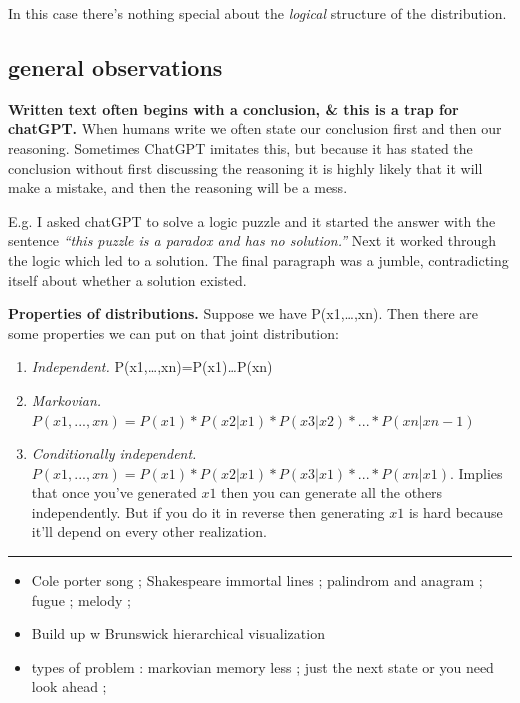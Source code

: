 \documentclass[
  11pt,
  letterpaper,
  DIV=11,
  numbers=noendperiod,
  oneside]{scrartcl}
\begin{document}
In this case there's nothing special about the \emph{logical} structure
of the distribution.

\hypertarget{general-observations}{%
\subsection{general observations}\label{general-observations}}

\textbf{Written text often begins with a conclusion, \& this is a trap
for chatGPT.} When humans write we often state our conclusion first and
then our reasoning. Sometimes ChatGPT imitates this, but because it has
stated the conclusion without first discussing the reasoning it is
highly likely that it will make a mistake, and then the reasoning will
be a mess.

E.g. I asked chatGPT to solve a logic puzzle and it started the answer
with the sentence \emph{``this puzzle is a paradox and has no
solution.''} Next it worked through the logic which led to a solution.
The final paragraph was a jumble, contradicting itself about whether a
solution existed.

\textbf{Properties of distributions.} Suppose we have P(x1,\ldots,xn).
Then there are some properties we can put on that joint distribution:

\begin{enumerate}
\def\labelenumi{\arabic{enumi}.}
\item
  \emph{Independent.} P(x1,\ldots,xn)=P(x1)\emph{\ldots{}}P(xn)
\item
  \emph{Markovian.}
  \(P(x1,...,xn)=P(x1)*P(x2|x1)*P(x3|x2)*...*P(xn|xn-1)\)
\item
  \emph{Conditionally independent.}
  \(P(x1,...,xn)=P(x1)*P(x2|x1)*P(x3|x1)*...*P(xn|x1)\). Implies that
  once you've generated \(x1\) then you can generate all the others
  independently. But if you do it in reverse then generating \(x1\) is
  hard because it'll depend on every other realization.
\end{enumerate}

\begin{center}\rule{0.5\linewidth}{0.5pt}\end{center}

\begin{itemize}
\item
  Cole porter song ; Shakespeare immortal lines ; palindrom and anagram
  ; fugue ; melody ;
\item
  Build up w Brunswick hierarchical visualization
\item
  types of problem : markovian memory less ; just the next state or you
  need look ahead ;
\end{itemize}
\end{document}
